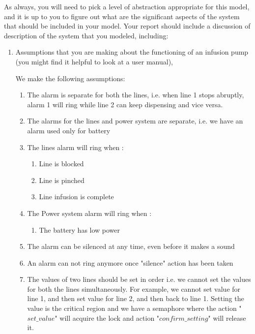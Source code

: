 \documentclass{article}
\begin{document}
\bigskip

As always, you will need to pick a level of abstraction appropriate for this model, and it is up to
you to figure out what are the significant aspects of the system that should be included in your
model.
Your report should include a discussion of description of the system that you modeled, including:
\begin{enumerate}
  \item Assumptions that you are making about the functioning of an infusion pump (you might find it helpful to look at a user manual),

  \bigskip

  We make the following assumptions:

  \begin{enumerate}
      \item The alarm is separate for both the lines, i.e. when line 1 stops abruptly, alarm 1 will ring while line 2 can keep dispensing and vice versa.
      \item The alarms for the lines and power system are separate, i.e. we have an alarm used only for battery
      \item The lines alarm will ring when :
          \begin{enumerate}
            \item Line is blocked
            \item Line is pinched
            \item Line infusion is complete
          \end{enumerate}
      \item The Power system alarm will ring when :
          \begin{enumerate}
            \item The battery has low power
          \end{enumerate}
      \item The alarm can be silenced at any time, even before it makes a sound 
      \item An alarm can not ring anymore once "silence" action has been taken
      \item The values of two lines should be set in order i.e. we cannot set the values for both the lines simultaneously. For example, we cannot set value for line 1, and then set value for line 2, and then back to line 1. Setting the value is the critical region and we have a semaphore where the action "$set\_value$" will acquire the lock and action "$confirm\_setting$" will release it.

\end{enumerate}
\end{enumerate}
\end{document}
